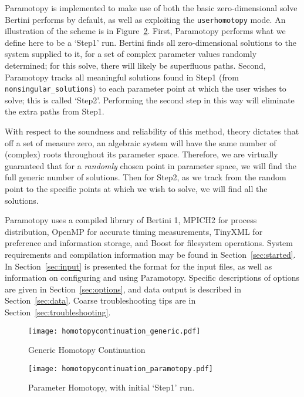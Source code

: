 Paramotopy is implemented to make use of both the basic zero-dimensional solve Bertini performs by default, as well as exploiting the \texttt{userhomotopy} mode.  An illustration of the scheme is in Figure~\ref{fig:paramotopy_homotopy_continuation}.  First, Paramotopy performs what we define here to be a `Step1' run.  Bertini finds all zero-dimensional solutions to the system supplied to it, for a set of complex parameter values randomly determined; for this solve, there will likely be superfluous paths.  Second, Paramotopy tracks all meaningful solutions found in Step1 (from \texttt{nonsingular\_solutions}) to each parameter point at which the user wishes to solve; this is called `Step2'. Performing the second step in this way will eliminate the extra paths from Step1.  
  
With respect to the soundness and reliability of this method, theory dictates that off a set of measure zero, an algebraic system will have the same number of (complex) roots throughout its parameter space.  Therefore, we are virtually guaranteed that for a \emph{randomly} chosen point in parameter space, we will find the full generic number of solutions.  Then for Step2, as we track from the random point to the specific points at which we wish to solve, we will find all the solutions.

Paramotopy uses a compiled library of Bertini 1, MPICH2 for process distribution, OpenMP for accurate timing measurements, TinyXML for preference and information storage, and Boost for filesystem operations.  System requirements and compilation information may be found in Section~\ref{sec:started}.  In Section~\ref{sec:input} is presented the format for the input files, as well as information on configuring and using Paramotopy.  Specific descriptions of options are given in Section~\ref{sec:options}, and data output is described in Section~\ref{sec:data}.  Coarse troubleshooting tips are in Section~\ref{sec:troubleshooting}.
  



\begin{figure}[h]
\begin{center}
\texttt{[image: homotopycontinuation\_generic.pdf]}
\caption[Generic Homotopy Continuation]{Generic Homotopy Continuation}
\label{fig:generic_homotopy_continuation}
\end{center}
\end{figure}


\begin{figure}[t]
\begin{center}
\texttt{[image: homotopycontinuation\_paramotopy.pdf]}
\caption[Parameter Homotopy]{Parameter Homotopy, with initial `Step1' run.}
\label{fig:paramotopy_homotopy_continuation}
\end{center}
\end{figure}


